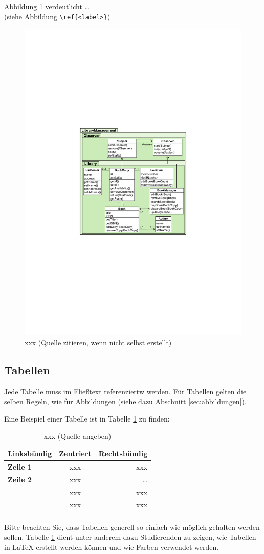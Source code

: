 Abbildung \ref{fig:xxx} verdeutlicht  \dots\\
(siehe Abbildung \verb|\ref{<label>}|)

\begin{figure}
	\centering
	\includegraphics[width=0.4\linewidth]{figures/figure1}
	\caption{xxx (Quelle zitieren, wenn nicht selbst erstellt)}
	\label{fig:xxx}
\end{figure}

\subsection{Tabellen}

Jede Tabelle muss im Fließtext referenziertw werden. Für Tabellen gelten die selben Regeln, wie für Abbildungen (siehe dazu Abschnitt \ref{sec:abbildungen}).

Eine Beispiel einer Tabelle ist in Tabelle \ref{tab:xxx} zu finden:
\begin{table}
	\centering
	\begin{tabular}{| >{\bfseries}l | c | r | }
		\hline
			\rowcolor{orange} \bfseries Linksbündig & \bfseries Zentriert & \bfseries Rechtsbündig \\
		\hline
		\hline
			Zeile 1 & xxx & xxx \\\hline
			Zeile 2 & xxx & \dots \\\hline
			\multirow{2}{*}{Zeile3}
			& xxx & xxx \\\cline{2-3}
			& xxx & xxx \\\hline
		\hline
			\multicolumn{3}{| c |}{xxx} \\\hline
	\end{tabular}
	\caption{xxx (Quelle angeben)}
	\label{tab:xxx}
\end{table}

Bitte beachten Sie, dass Tabellen generell so einfach wie möglich gehalten werden sollen. Tabelle \ref{tab:xxx} dient unter anderem dazu Studierenden zu zeigen, wie Tabellen in \LaTeX\xspace erstellt werden können und wie Farben verwendet werden.